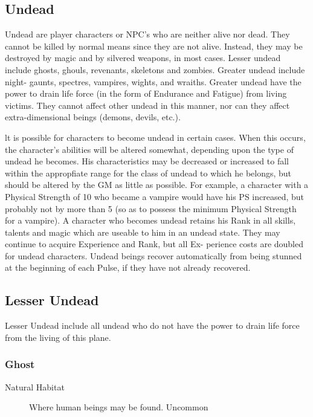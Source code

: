 \begin{multicols*}{2}

\setlength\columnseprule{0.2mm}

\section{Undead}
Undead are player characters or NPC's who are neither alive nor
dead. They cannot be killed by normal means since they are not
alive. Instead, they may be destroyed by magic and by silvered
weapons, in most cases.  Lesser undead include ghosts, ghouls,
revenants, skeletons and zombies.  Greater undead include night-
gaunts, spectres, vampires, wights, and wraiths.  Greater undead have
the power to drain life force (in the form of Endurance and Fatigue)
from living victims.  They cannot affect other undead in this manner,
nor can they affect extra-dimensional beings (demons, devils, etc.).

lt is possible for characters to become undead in certain cases.  When
this occurs, the character's abilities will be altered somewhat,
depending upon the type of undead he becomes.  His characteristics may
be decreased or increased to fall within the appropfiate range for the
class of undead to which he belongs, but should be altered by the GM
as little as possible.  For example, a character with a Physical
Strength of 10 who became a vampire would have his PS increased, but
probably not by more than 5 (so as to possess the minimum Physical
Strength for a vampire).  A character who becomes undead retains his
Rank in all skills, talents and magic which are useable to him in an
undead state.  They may continue to acquire Experience and Rank, but
all Ex- perience costs are doubled for undead characters.  Undead
beings recover automatically from being stunned at the beginning of
each Pulse, if they have not already recovered.

\subsection{Lesser Undead}
Lesser Undead include all undead who do not have the power to drain
life force from the living of this plane.

\subsubsection{Ghost}

\begin{description}
\item[Natural Habitat] Where human beings may be found. Uncommon


\end{description}
\end{multicols*}
